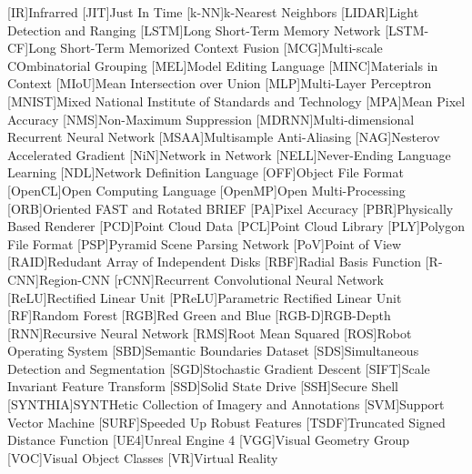 \begin{acronym}
	[IR]{Infrarred}
    [JIT]{Just In Time}
    [k-NN]{k-Nearest Neighbors}
    [LIDAR]{Light Detection and Ranging}
    [LSTM]{Long Short-Term Memory Network}
    [LSTM-CF]{Long Short-Term Memorized Context Fusion}
    [MCG]{Multi-scale COmbinatorial Grouping}
    [MEL]{Model Editing Language}
    [MINC]{Materials in Context}
    [MIoU]{Mean Intersection over Union}
	[MLP]{Multi-Layer Perceptron}
    [MNIST]{Mixed National Institute of Standards and Technology}
    [MPA]{Mean Pixel Accuracy}
    [NMS]{Non-Maximum Suppression}
    [MDRNN]{Multi-dimensional Recurrent Neural Network}
    [MSAA]{Multisample Anti-Aliasing}
    [NAG]{Nesterov Accelerated Gradient}
    [NiN]{Network in Network}
    [NELL]{Never-Ending Language Learning}
	[NDL]{Network Definition Language}
	[OFF]{Object File Format}
	[OpenCL]{Open Computing Language}
	[OpenMP]{Open Multi-Processing}
    [ORB]{Oriented FAST and Rotated BRIEF}
    [PA]{Pixel Accuracy}
    [PBR]{Physically Based Renderer}
	[PCD]{Point Cloud Data}
    [PCL]{Point Cloud Library}
    [PLY]{Polygon File Format}
    [PSP]{Pyramid Scene Parsing Network}
	[PoV]{Point of View}
	[RAID]{Redudant Array of Independent Disks}
    [RBF]{Radial Basis Function}
    [R-CNN]{Region-CNN}
    [rCNN]{Recurrent Convolutional Neural Network}
	[ReLU]{Rectified Linear Unit}
    [PReLU]{Parametric Rectified Linear Unit}
    [RF]{Random Forest}
	[RGB]{Red Green and Blue}
    [RGB-D]{RGB-Depth}
	[RNN]{Recursive Neural Network}
    [RMS]{Root Mean Squared}
    [ROS]{Robot Operating System}
    [SBD]{Semantic Boundaries Dataset}
    [SDS]{Simultaneous Detection and Segmentation}
	[SGD]{Stochastic Gradient Descent}
	[SIFT]{Scale Invariant Feature Transform}
	[SSD]{Solid State Drive}
    [SSH]{Secure Shell}
    [SYNTHIA]{SYNTHetic Collection of Imagery and Annotations}
    [SVM]{Support Vector Machine}
	[SURF]{Speeded Up Robust Features}
    [TSDF]{Truncated Signed Distance Function}
    [UE4]{Unreal Engine 4}
    [VGG]{Visual Geometry Group}
    [VOC]{Visual Object Classes}
    [VR]{Virtual Reality}
\end{acronym}
